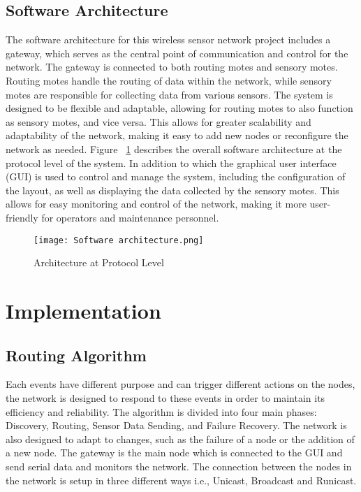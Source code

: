 \documentclass[conference]{IEEEtran}
\begin{document}
\subsection{Software Architecture}\label{AA}
The software architecture for this wireless sensor network project includes a gateway, which serves as the central point of communication and control for the network. The gateway is connected to both routing motes and sensory motes. Routing motes handle the routing of data within the network, while sensory motes are responsible for collecting data from various sensors. The system is designed to be flexible and adaptable, allowing for routing motes to also function as sensory motes, and vice versa. This allows for greater scalability and adaptability of the network, making it easy to add new nodes or reconfigure the network as needed. Figure ~\ref{fig:Architecture at Protocol Level} describes the overall software architecture at the protocol level of the system. In addition to which the graphical user interface (GUI) is used to control and manage the system, including the configuration of the layout, as well as displaying the data collected by the sensory motes. This allows for easy monitoring and control of the network, making it more user-friendly for operators and maintenance personnel.


\begin{figure}
  \texttt{[image: Software architecture.png]}
  \caption{Architecture at Protocol Level}
  \label{fig:Architecture at Protocol Level}
\end{figure}

\section{Implementation}

\subsection{Routing Algorithm}\label{AA}

Each events have different purpose and can trigger different actions on the nodes, the network is designed to respond to these events in order to maintain its efficiency and reliability. The algorithm is divided into four main phases: Discovery, Routing, Sensor Data Sending, and Failure Recovery. The network is also designed to adapt to changes, such as the failure of a node or the addition of a new node. The gateway is the main node which is connected to the GUI and send serial data and monitors the network.
The connection between the nodes in the network is setup in three different ways i.e., Unicast, Broadcast and Runicast.
\end{document}

